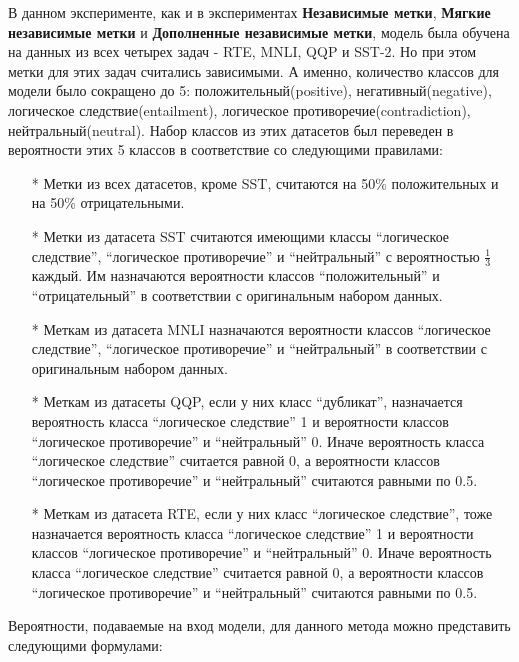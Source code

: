 В данном эксперименте, как и в экспериментах \textbf{Независимые метки}, \textbf{Мягкие независимые метки} и \textbf{Дополненные независимые метки}, модель была обучена на данных из всех четырех задач - RTE, MNLI, QQP и SST-2. Но при этом метки для этих задач считались зависимыми. А именно, количество классов для модели было сокращено до 5: положительный(positive), негативный(negative), логическое следствие(entailment), логическое противоречие(contradiction), нейтральный(neutral). Набор классов из этих датасетов был переведен в вероятности этих 5 классов в соответствие со следующими правилами:
\begin{itemize}
\item[*] Метки из всех датасетов, кроме SST, считаются на 50\% положительных и на 50\% отрицательными.
\item[*] Метки из датасета SST считаются имеющими классы “логическое следствие”, “логическое противоречие” и “нейтральный” с вероятностью $\frac{1}{3}$ каждый. Им назначаются вероятности классов “положительный” и “отрицательный” в соответствии с оригинальным набором данных.
\item[*] Меткам из датасета MNLI назначаются вероятности классов “логическое следствие”, “логическое противоречие” и “нейтральный” в соответствии с оригинальным набором данных.
\item[*] Меткам из датасеты QQP, если у них класс “дубликат”, назначается вероятность класса “логическое следствие” 1 и вероятности классов “логическое противоречие” и “нейтральный” 0. Иначе вероятность класса “логическое следствие” считается равной 0, а вероятности классов “логическое противоречие” и “нейтральный” считаются равными по 0.5.
\item[*] Меткам из датасета RTE, если у них класс “логическое следствие”, тоже назначается вероятность класса “логическое следствие” 1 и вероятности классов “логическое противоречие” и “нейтральный” 0. Иначе вероятность класса “логическое следствие” считается равной 0, а вероятности классов “логическое противоречие” и “нейтральный” считаются равными по 0.5.
\end{itemize}

Вероятности, подаваемые на вход модели, для данного метода можно представить следующими формулами:

